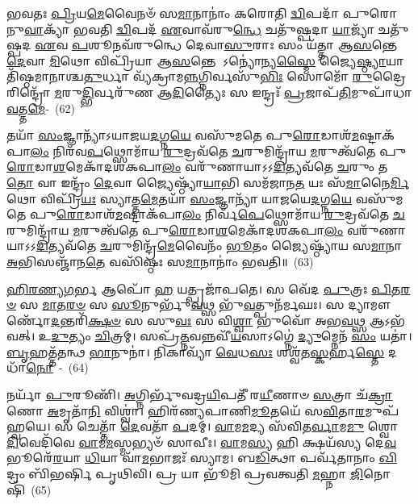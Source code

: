 𑌭𑌵𑌤𑌃 \ul{𑌪𑍍𑌰𑌿}\-𑌯\-\ul{𑌮𑍇}\-𑌵𑍈𑌨𑍞᳴ 𑌸\-\ul{𑌮𑌾}\-𑌨𑌾𑌨𑌾𑌂॑ 𑌕𑌰𑍋𑌤𑌿 \ul{𑌦𑍍𑌵𑌿}\-𑌪𑌦𑌾᳴ 𑌪𑍁𑌰𑍋𑌨𑍁\-\ul{𑌵𑌾}\-𑌕𑍍𑌯𑌾᳴ 𑌭𑌵𑌤𑌿 \ul{𑌦𑍍𑌵𑌿}\-𑌪𑌦᳴ \ul{𑌏}\-𑌵𑌾𑌵᳴\-𑌰𑍁\-\ul{𑌨𑍍𑌧𑍇} 𑌚𑌤𑍁᳴𑌷𑍍𑌪𑌦𑌾 \ul{𑌯𑌾}\-𑌜𑍍𑌯𑌾᳴ 𑌚𑌤𑍁᳴𑌷𑍍𑌪𑌦 \ul{𑌏}\-𑌵 \ul{𑌪}\-𑌶𑍂𑌨𑌵᳴\-𑌰𑍁𑌨𑍍𑌧𑍇 𑌦𑍇𑌵𑌾\-\ul{𑌸𑍁}\-𑌰𑌾𑌃 𑌸𑌂 𑌯᳴𑌤𑍍𑌤𑌾 𑌆\-\ul{𑌸}\-𑌨𑍍𑌤𑍇 \ul{𑌦𑍇}\-𑌵𑌾 \ul{𑌮𑌿}\-𑌥𑍋 𑌵𑌿𑌪𑍍𑌰𑌿᳴𑌯𑌾 𑌆\-\ul{𑌸}\-𑌨𑍍𑌤𑍇 \-𑌽𑌨𑍍𑌯𑍋॑𑌨𑍍𑌯\-\ul{𑌸𑍍𑌮𑍈} 𑌜𑍍𑌯𑍈\-\ul{𑌷𑍍𑌠𑍍𑌯𑌾}\-𑌯𑌾𑌤𑌿᳴𑌷𑍍𑌠𑌮𑌾𑌨𑌾𑌶𑍍𑌚\-\ul{𑌤𑍁}\-𑌰𑍍𑌧𑌾 𑌵𑍍𑌯᳴𑌕𑍍𑌰𑌾𑌮\-\ul{𑌨𑍍𑌨}\-𑌗𑍍𑌨𑌿𑌰𑍍𑌵𑌸𑍁᳴\-\ul{𑌭𑌿𑌃} 𑌸𑍋𑌮𑍋᳴ \ul{𑌰𑍁}\-𑌦𑍍𑌰𑍈𑌰𑌿𑌨𑍍𑌦𑍍𑌰𑍋᳴ \ul{𑌮}\-𑌰𑍁\-\ul{𑌦𑍍𑌭𑌿}\-𑌰𑍍𑌵𑌰𑍁᳴𑌣 𑌆\-\ul{𑌦𑌿}\-𑌤𑍍𑌯𑍈𑌃 𑌸 𑌇𑌨𑍍𑌦𑍍𑌰𑌃᳴ \ul{𑌪𑍍𑌰}\-𑌜𑌾𑌪᳴\-\ul{𑌤𑌿}\-𑌮𑍁𑌪𑌾᳴𑌧𑌾\-\ul{𑌵}\-𑌤𑍍𑌤\-\ul{𑌮𑍇}\--~(62)

𑌤𑌯𑌾᳴ \ul{𑌸𑌂}\-𑌜𑍍𑌞𑌾𑌨𑍍𑌯𑌾᳴\-𑌽𑌯𑌾𑌜𑌯\-\ul{𑌦}\-𑌗𑍍𑌨\-\ul{𑌯𑍇} 𑌵𑌸𑍁᳴𑌮𑌤𑍇 𑌪𑍁\-\ul{𑌰𑍋}\-𑌡𑌾𑌶᳴\-\-\ul{𑌮}\-𑌷𑍍𑌟𑌾\-𑌕᳴𑌪𑌾\-\ul{𑌲𑌂} 𑌨𑌿𑌰᳴𑌵\-\ul{𑌪}\-𑌥𑍍𑌸𑍋𑌮𑌾᳴𑌯 \ul{𑌰𑍁}\-𑌦𑍍𑌰𑌵᳴𑌤𑍇 \ul{𑌚}\-𑌰𑍁𑌮𑌿𑌨𑍍𑌦𑍍𑌰𑌾᳴𑌯 \ul{𑌮}\-𑌰𑍁𑌤𑍍𑌵᳴𑌤𑍇 𑌪𑍁\-\ul{𑌰𑍋}\-𑌡𑌾\-\ul{𑌶}\-𑌮𑍇𑌕𑌾᳴\-𑌦𑌶\-𑌕𑌪𑌾\-\ul{𑌲𑌂} 𑌵𑌰𑍁᳴𑌣𑌾𑌯𑌾\-𑌽\-𑌽\-\ul{𑌦𑌿}\-𑌤𑍍𑌯𑌵᳴𑌤𑍇 \ul{𑌚}\-𑌰𑍁𑌂 𑌤\-\ul{𑌤𑍋} 𑌵𑌾 𑌇𑌨𑍍𑌦𑍍𑌰𑌂᳴ \ul{𑌦𑍇}\-𑌵𑌾 𑌜𑍍𑌯𑍈𑌷𑍍𑌠𑍍𑌯𑌾᳴\-\ul{𑌯𑌾}\-𑌭𑌿 𑌸𑌮᳴𑌜𑌾𑌨\-\ul{𑌤} 𑌯𑌃 𑌸᳴\-\ul{𑌮𑌾}\-𑌨𑍈\-\ul{𑌰𑍍𑌮𑌿}\-𑌥𑍋 𑌵𑌿𑌪𑍍𑌰𑌿᳴\-\ul{𑌯𑌃} 𑌸𑍍𑌯𑌾𑌤𑍍𑌤\-\ul{𑌮𑍇}\-𑌤𑌯𑌾᳴ \ul{𑌸𑌂}\-𑌜𑍍𑌞𑌾𑌨𑍍𑌯𑌾᳴ 𑌯𑌾𑌜𑌯𑍇\-\ul{𑌦}\-𑌗𑍍𑌨\-\ul{𑌯𑍇} 𑌵𑌸𑍁᳴𑌮𑌤𑍇 𑌪𑍁\-\ul{𑌰𑍋}\-𑌡𑌾𑌶᳴\-\-\ul{𑌮}\-𑌷𑍍𑌟𑌾\-𑌕᳴𑌪𑌾\-\ul{𑌲𑌂} 𑌨𑌿𑌰𑍍𑌵᳴\-\ul{𑌪𑍇}\-𑌥𑍍𑌸𑍋𑌮𑌾᳴𑌯 \ul{𑌰𑍁}\-𑌦𑍍𑌰𑌵᳴𑌤𑍇 \ul{𑌚}\-𑌰𑍁𑌮𑌿𑌨𑍍𑌦𑍍𑌰𑌾᳴𑌯 \ul{𑌮}\-𑌰𑍁𑌤𑍍𑌵᳴𑌤𑍇 𑌪𑍁\-\ul{𑌰𑍋}\-𑌡𑌾\-\ul{𑌶}\-𑌮𑍇𑌕𑌾᳴\-𑌦𑌶\-𑌕𑌪𑌾\-\ul{𑌲𑌂} 𑌵𑌰𑍁᳴𑌣𑌾𑌯𑌾\-𑌽\-𑌽\-\ul{𑌦𑌿}\-𑌤𑍍𑌯𑌵᳴𑌤𑍇 \ul{𑌚}\-𑌰𑍁𑌮𑌿𑌨𑍍𑌦𑍍𑌰᳴\-\ul{𑌮𑍇}\-𑌵𑍈𑌨𑌂᳴ \ul{𑌭𑍂}\-𑌤𑌂 𑌜𑍍𑌯𑍈𑌷𑍍𑌠𑍍𑌯𑌾᳴𑌯 𑌸\-\ul{𑌮𑌾}\-𑌨𑌾 \ul{𑌅}\-𑌭𑌿𑌸𑌞𑍍𑌜𑌾᳴𑌨\-\ul{𑌤𑍇} 𑌵𑌸𑌿᳴𑌷𑍍𑌠𑌃 𑌸\-\ul{𑌮𑌾}\-𑌨𑌾𑌨𑌾𑌂॑ 𑌭𑌵𑌤𑌿॥~(63)

{\anuvakamend[{𑌵𑌿𑌶᳴\-\ul{𑌮𑍇}\-𑌵 𑌤𑌿᳴𑌷𑍍𑌠\-\ul{𑌨𑍍𑌤𑍍𑌯𑍇}\-𑌤𑌾\-\ul{𑌮𑍇}\-𑌵𑌾\-\ul{𑌥𑍈}\-𑌨𑍍𑌦𑍍𑌰𑌸𑍍𑌯᳴ 𑌯𑌾𑌜𑍍𑌯𑌾𑌨𑍁\-\ul{𑌵𑌾}\-𑌕𑍍𑌯𑍇᳴ 𑌤𑌂 𑌵𑌰𑍁᳴𑌣𑌾\-\ul{𑌯} 𑌚𑌤𑍁᳴𑌰𑍍𑌦𑌶 𑌚}]}


\-\ul{𑌹𑌿}\-\-\ul{𑌰}\-\-\ul{𑌣𑍍𑌯}\-\-\ul{𑌗}\-𑌰𑍍𑌭 𑌆𑌪𑍋᳴ \ul{𑌹} 𑌯𑌤𑍍𑌪𑍍𑌰𑌜𑌾᳴𑌪𑌤𑍇। 𑌸 𑌵𑍇᳴𑌦 \ul{𑌪𑍁}\-𑌤𑍍𑌰𑌃 \ul{𑌪𑌿}\-𑌤\-\ul{𑌰}\-\-\ul{𑍞} 𑌸 \ul{𑌮𑌾}\-𑌤\-\ul{𑌰}\-\-\ul{𑍞} 𑌸 \ul{𑌸𑍂}\-𑌨𑍁𑌰𑍍𑌭𑍁᳴\-\ul{𑌵}\-𑌥𑍍𑌸 𑌭𑍁᳴\-\ul{𑌵}\-𑌤𑍍𑌪𑍁𑌨᳴𑌰𑍍𑌮𑌘𑌃। 𑌸 𑌦𑍍𑌯𑌾𑌮𑍗𑌰𑍍𑌣𑍋᳴\-\ul{𑌦}\-𑌨𑍍𑌤𑌰𑌿᳴\-\ul{𑌕𑍍𑌷}\-\-\ul{𑍞} 𑌸 𑌸𑍁\-\ul{𑌵𑌃} 𑌸 𑌵𑌿\-\ul{𑌶𑍍𑌵𑌾} 𑌭𑍁𑌵𑍋᳴ 𑌅𑌭\-\ul{𑌵}\-𑌥𑍍𑌸 𑌆\-𑌽𑌭᳴𑌵𑌤𑍍। 𑌉\-\ul{𑌦𑍁}\-𑌤𑍍𑌯𑌂 \ul{𑌚𑌿}\-𑌤𑍍𑌰𑌮𑍍। 𑌸𑌪𑍍𑌰᳴\-\ul{𑌤𑍍𑌨}\-𑌵𑌨𑍍𑌨𑌵𑍀᳴\-\ul{𑌯}\-𑌸𑌾\-𑌽𑌗𑍍𑌨𑍇॑ \ul{𑌦𑍍𑌯𑍁}\-𑌮𑍍𑌨𑍇𑌨᳴ \ul{𑌸𑌂} 𑌯𑌤𑌾॑। \ul{𑌬𑍃}\-𑌹𑌤𑍍𑌤᳴𑌤𑌨𑍍𑌥 \ul{𑌭𑌾}\-𑌨𑍁𑌨𑌾॑। 𑌨𑌿𑌕𑌾𑌵𑍍𑌯𑌾᳴ \ul{𑌵𑍇}\-𑌧\-\ul{𑌸𑌃} 𑌶𑌶𑍍𑌵᳴𑌤\-\ul{𑌸𑍍𑌕}\-𑌰𑍍\mbox{}𑌹\-\ul{𑌸𑍍𑌤𑍇} 𑌦𑌧𑌾᳴\-\ul{𑌨𑍋}\-~-~(64)

𑌨𑌰𑍍𑌯𑌾᳴ \ul{𑌪𑍁}\-𑌰𑍂𑌣𑌿᳴। \ul{𑌅}\-𑌗𑍍𑌨𑌿𑌰𑍍𑌭𑍁᳴𑌵𑌦𑍍𑌰\-\ul{𑌯𑌿}\-𑌪𑌤𑍀᳴ 𑌰\-\ul{𑌯𑍀}\-𑌣𑌾𑍞 \ul{𑌸}\-𑌤𑍍𑌰𑌾 𑌚᳴\-\ul{𑌕𑍍𑌰𑌾}\-𑌣𑍋 \ul{𑌅}\-𑌮𑍃𑌤𑌾᳴\-\ul{𑌨𑌿} 𑌵𑌿𑌶𑍍𑌵𑌾॑। 𑌹𑌿𑌰᳴𑌣𑍍𑌯𑌪𑌾𑌣𑌿\-\ul{𑌮𑍂}\-𑌤𑌯𑍇᳴ 𑌸\-\ul{𑌵𑌿}\-𑌤𑌾\-\ul{𑌰}\-𑌮𑍁𑌪᳴ 𑌹𑍍𑌵𑌯𑍇। 𑌸 𑌚𑍇𑌤𑍍𑌤𑌾᳴ \ul{𑌦𑍇}\-𑌵𑌤𑌾᳴ \ul{𑌪}\-𑌦𑌮𑍍। \ul{𑌵𑌾}\-𑌮\-\ul{𑌮}\-𑌦𑍍𑌯 𑌸᳴𑌵𑌿𑌤\-\ul{𑌰𑍍𑌵𑌾}\-𑌮\-\ul{𑌮𑍁} 𑌶𑍍𑌵𑍋 \ul{𑌦𑌿}\-𑌵𑍇𑌦𑌿᳴𑌵𑍇 \ul{𑌵𑌾}\-𑌮\-\ul{𑌮}\-𑌸𑍍𑌮𑌭𑍍𑌯𑍞᳴ 𑌸𑌾𑌵𑍀𑌃। \ul{𑌵𑌾}\-𑌮\-\ul{𑌸𑍍𑌯} 𑌹𑌿 𑌕𑍍𑌷𑌯᳴𑌸𑍍𑌯 𑌦𑍇\-\ul{𑌵} 𑌭𑍂𑌰𑍇᳴\-\ul{𑌰}\-𑌯𑌾 \ul{𑌧𑌿}\-𑌯𑌾 𑌵𑌾᳴\-\ul{𑌮}\-𑌭𑌾𑌜𑌃᳴ 𑌸𑍍𑌯𑌾𑌮। 𑌬\-\ul{𑌡𑌿}\-𑌤𑍍𑌥𑌾 𑌪𑌰𑍍𑌵᳴𑌤𑌾𑌨𑌾𑌂 \ul{𑌖𑌿}\-𑌦𑍍𑌰𑌂 𑌬𑌿᳴𑌭𑌰𑍍\mbox{}𑌷𑌿 𑌪𑍃𑌥𑌿𑌵𑌿। 𑌪𑍍𑌰 𑌯𑌾 𑌭𑍂᳴𑌮𑌿 𑌪𑍍𑌰𑌵𑌤𑍍𑌵𑌤𑌿 \ul{𑌮}\-𑌹𑍍𑌨𑌾 \ul{𑌜𑌿}\-𑌨𑍋𑌷𑌿᳴~(65)

